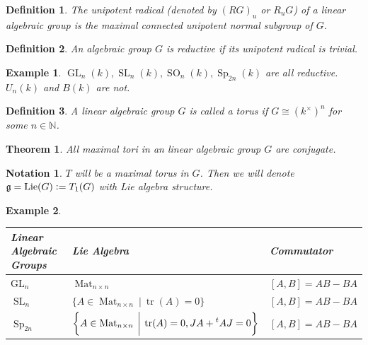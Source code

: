 \documentclass[10pt]{article}
\newtheorem{theorem}{Theorem} [section]
\newtheorem{definition}{Definition}[section]
\newtheorem{notation}{Notation}[section]
\newtheorem{example}{Example}[section]
\numberwithin{equation}{theorem}
\DeclareMathOperator{\tr}{tr}
\DeclareMathOperator{\GL}{GL}
\DeclareMathOperator{\SL}{SL}
\DeclareMathOperator{\SO}{SO}
\DeclareMathOperator{\Sp}{Sp}
\DeclareMathOperator{\Mat}{Mat}
\newcommand{\defeq}{\vcentcolon=}
\newcommand{\bN}[0]{\mathbb{N}}
\newcommand{\g}[0]{\mathfrak{g}}
\newcommand{\sep}[0]{\:|\:}
\begin{document}
\begin{definition}
    The unipotent radical (denoted by $(RG)_u$ or $R_uG$) of a linear algebraic group is the maximal connected unipotent normal subgroup of $G$.
\end{definition}

\begin{definition}
    An algebraic group $G$ is reductive if its unipotent radical is trivial.
\end{definition}

\begin{example}
    $\GL_n(k),\SL_n(k),\SO_n(k),\Sp_{2n}(k)$ are all reductive. $U_n(k)$ and $B(k)$ are not.
\end{example}

\begin{definition}
    A linear algebraic group $G$ is called a torus if $G\cong (k^\times)^n$ for some $n\in\bN$.
\end{definition}

\begin{theorem}
    All maximal tori in an linear algebraic group $G$ are conjugate.
\end{theorem}

\begin{notation}
    $T$ will be a maximal torus in $G$. Then we will denote $\g = \mathrm{Lie}(G) \defeq T_1(G)$ with Lie algebra structure.
\end{notation}

\begin{example}
    \begin{center}
\begin{tabular}{l|l|l}
Linear Algebraic Groups & Lie Algebra                                                                                                                                                                                                                                                                         & Commutator      \\ \hline
$\mathrm{GL}_n$         & $\Mat_{n\times n}$                                                                                                                                                                                                                                                                  & $[A,B] = AB-BA$ \\ \hline
$\SL_n$                 & $\{A\in \Mat_{n\times n}\sep\tr(A) = 0\}$                                                                                                                                                                                                & $[A,B] = AB-BA$ \\ \hline
$\Sp_{2n}$              & $\left\{A\in\Mat_{n\times n}\:\bigg{\vert}\: \tr(A) = 0,JA+\prescript{t}{}{A}J = 0\right\}$ & $[A,B] = AB-BA$
\end{tabular}
    \end{center}
\end{example}
\end{document}
